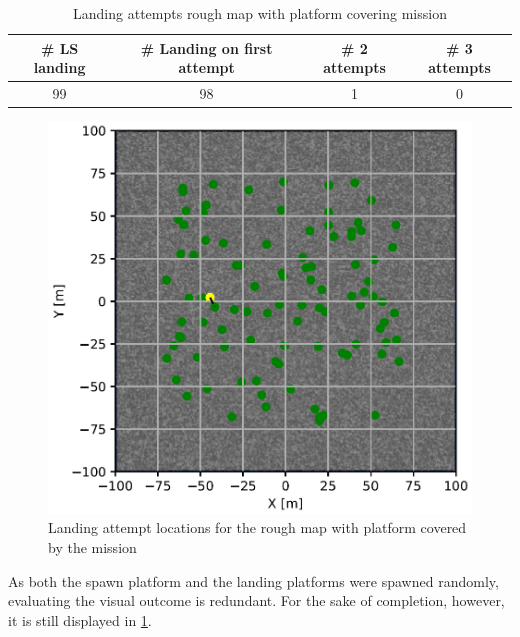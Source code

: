        \begin{table}[h]
            \begin{center}
             \caption{Landing attempts rough map with platform covering mission}\vspace{1ex}
             \label{tab:land_nums_rough_coverage}
             \begin{tabular}{|c|c|c|c|}
             \hline
             \# LS landing & \# Landing on first attempt & \# 2 attempts & \# 3 attempts\\ \hline \hline
             99 & 98 & 1 & 0 \\
             \hline
             \end{tabular}
            \end{center}
        \end{table}

        \begin{figure}[h]
        \centering
        \includegraphics[scale=0.5]{images/evaluation/landing_rough_covered.png}
        \caption{Landing attempt locations for the rough map with platform covered by the mission}
        \label{fig:land_rough_covered}
        \end{figure}

        As both the spawn platform and the landing platforms were spawned randomly, evaluating the visual outcome is redundant. For the sake of completion, however, it is still displayed in \cref{fig:land_rough_covered}.

